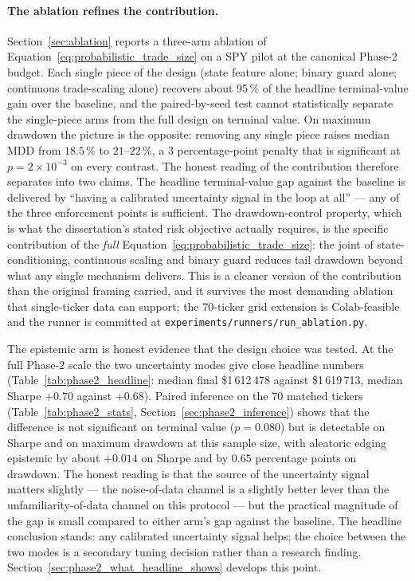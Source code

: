 \paragraph{The ablation refines the contribution.} Section~\ref{sec:ablation} reports a three-arm ablation of Equation~\ref{eq:probabilistic_trade_size} on a SPY pilot at the canonical Phase-2 budget. Each single piece of the design (state feature alone; binary guard alone; continuous trade-scaling alone) recovers about 95\,\% of the headline terminal-value gain over the baseline, and the paired-by-seed test cannot statistically separate the single-piece arms from the full design on terminal value. On maximum drawdown the picture is the opposite: removing any single piece raises median MDD from $18.5$\,\% to $21$--$22$\,\%, a 3 percentage-point penalty that is significant at $p = 2 \times 10^{-3}$ on every contrast. The honest reading of the contribution therefore separates into two claims. The headline terminal-value gap against the baseline is delivered by ``having a calibrated uncertainty signal in the loop at all'' --- any of the three enforcement points is sufficient. The drawdown-control property, which is what the dissertation's stated risk objective actually requires, is the specific contribution of the \emph{full} Equation~\ref{eq:probabilistic_trade_size}: the joint of state-conditioning, continuous scaling and binary guard reduces tail drawdown beyond what any single mechanism delivers. This is a cleaner version of the contribution than the original framing carried, and it survives the most demanding ablation that single-ticker data can support; the 70-ticker grid extension is Colab-feasible and the runner is committed at \texttt{experiments/runners/run\_ablation.py}.

The epistemic arm is honest evidence that the design choice was tested. At the full Phase-2 scale the two uncertainty modes give close headline numbers (Table~\ref{tab:phase2_headline}: median final \$1\,612\,478 against \$1\,619\,713, median Sharpe $+0.70$ against $+0.68$). Paired inference on the 70 matched tickers (Table~\ref{tab:phase2_stats}, Section~\ref{sec:phase2_inference}) shows that the difference is not significant on terminal value ($p = 0.080$) but is detectable on Sharpe and on maximum drawdown at this sample size, with aleatoric edging epistemic by about $+0.014$ on Sharpe and by $0.65$ percentage points on drawdown. The honest reading is that the source of the uncertainty signal matters slightly --- the noise-of-data channel is a slightly better lever than the unfamiliarity-of-data channel on this protocol --- but the practical magnitude of the gap is small compared to either arm's gap against the baseline. The headline conclusion stands: any calibrated uncertainty signal helps; the choice between the two modes is a secondary tuning decision rather than a research finding. Section~\ref{sec:phase2_what_headline_shows} develops this point.

